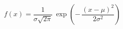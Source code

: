 \documentclass[aspectratio=169]{beamer}
\begin{document}
\begin{wallpaperframe}
\Huge
\[
f(x) = \frac{1}{\sigma\sqrt{2\pi}}\,
\exp\!\left(-\,\frac{(x-\mu)^2}{2\sigma^2}\right)
\]
\end{wallpaperframe}
\end{document}
